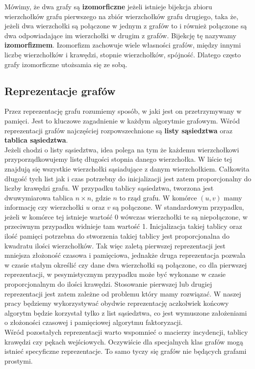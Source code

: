 \documentclass[12pt,a4paper,titlepage]{article}
\newcommand\tab[1][1cm]{\hspace*{#1}}
\begin{document}
Mówimy, że dwa grafy są \textbf{izomorficzne} jeżeli istnieje bijekcja zbioru wierzchołków grafu pierwszego na zbiór wierzchołków grafu drugiego, taka że, jeżeli dwa wierzchołki są połączone w jednym z grafów to i również połączone są dwa odpowiadające im wierzchołki w drugim z grafów. Bijekcję tę nazywamy \textbf{izomorfizmem}. Izomorfizm zachowuje wiele własności grafów, między innymi liczbę wierzchołków i krawędzi, stopnie wierzchołków, spójność. Dlatego często grafy izomorficzne utożsamia się ze sobą.\\
\subsection{Reprezentacje grafów}
Przez reprezentację grafu rozumiemy sposób, w jaki jest on przetrzymywany w pamięci. Jest to kluczowe zagadnienie w każdym algorytmie grafowym. Wśród reprezentacji grafów najczęściej rozpowszechnione są \textbf{listy sąsiedztwa} oraz \textbf{tablica sąsiedztwa}.\\
\tab[0.6cm]Jeżeli chodzi o listy sąsiedztwa, idea polega na tym że każdemu wierzchołkowi przyporządkowujemy listę długości stopnia danego wierzchołka. W liście tej znajdują się wszystkie wierzchołki sąsiadujące z danym wierzchołkiem. Całkowita długość tych list jak i czas potrzebny do inicjalizacji jest zatem proporcjonalny do liczby krawędzi grafu. W przypadku tablicy sąsiedztwa, tworzona jest dwuwymiarowa tablica $n \times n$, gdzie $n$ to rząd grafu. W komórce $(u,v)$ mamy informację czy wierzchołki $u$ oraz $v$ są połączone. W standardowym przypadku, jeżeli w komórce tej istnieje wartość 0 wówczas wierzchołki te są niepołączone, w przeciwnym przypadku widnieje tam wartość 1. Inicjalizacja takiej tablicy oraz ilość pamięci potrzebna do stworzenia takiej tablicy jest proporcjonalna do kwadratu ilości wierzchołków. Tak więc zaletą pierwszej reprezentacji jest mniejsza złożoność czasowa i pamięciowa, jednakże druga reprezentacja pozwala w czasie stałym określić czy dane dwa wierzchołki są połączone, co dla pierwszej reprezentacji, w pesymistycznym przypadku może być wykonane w czasie proporcjonalnym do ilości krawędzi. Stosowanie pierwszej lub drugiej reprezentacji jest zatem zależne od problemu który mamy rozwiązać. W naszej pracy będziemy wykorzystywać obydwie reprezentację aczkolwiek końcowy algorytm będzie korzystał tylko z list sąsiedztwa, co jest wymuszone założeniami o złożoności czasowej i pamięciowej algorytmu faktoryzacji.\\
\tab[0.6cm]Wśród pozostałych reprezentacji warto wspomnieć o macierzy incydencji, tablicy krawędzi czy pękach wejściowych. Oczywiście dla specjalnych klas grafów mogą istnieć specyficzne reprezentacje. To samo tyczy się grafów nie będących grafami prostymi.
\end{document}
